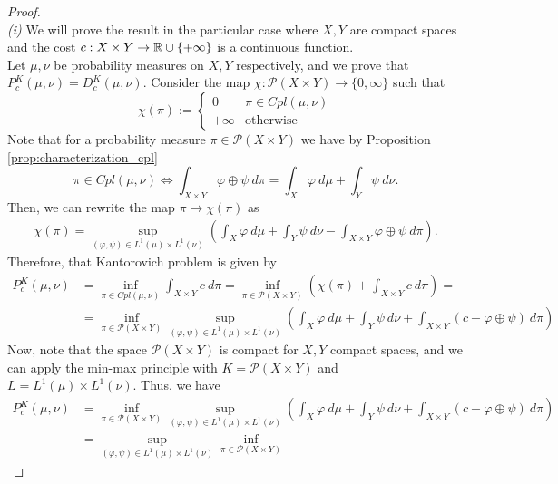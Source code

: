\documentclass[../main.tex]{subfiles}
\begin{document}
\begin{proof} \ \\
    \textit{(i)} We will prove the result in the particular case where $X, Y$ are compact spaces and the cost $c: X\times Y\to \mathbb{R}\cup\{+\infty\}$ is a continuous function. \\
    Let $\mu, \nu$ be probability measures on $X, Y$ respectively, and we prove that $P^K_c(\mu, \nu) = D^K_c(\mu, \nu)$. Consider the map $\chi : \mathcal{P}(X\times Y) \to \{0, \infty\}$ such that
    $$
    \chi(\pi) :=
    \begin{cases}
        0 & \pi\in Cpl(\mu, \nu) \\
        +\infty & \text{otherwise}
    \end{cases}
    $$
    Note that for a probability measure $\pi\in\mathcal{P}(X\times Y)$ we have by Proposition \ref{prop:characterization_cpl}
    $$
    \pi\in Cpl(\mu, \nu) \iff \int_{X\times Y} \varphi\oplus\psi \ d\pi = \int_X \varphi \ d\mu + \int_Y \psi \ d\nu.
    $$
    Then, we can rewrite the map $\pi\to\chi(\pi)$ as 
    \begin{align*}
        \chi(\pi) = \sup_{(\varphi, \psi)\in L^1(\mu)\times L^1(\nu)} 
        \left(\int_X \varphi \ d\mu + \int_Y \psi \ d\nu - \int_{X\times Y} \varphi \oplus \psi \ d\pi\right).
    \end{align*}
    Therefore, that Kantorovich problem is given by
    \begin{align*}
        P^K_c(\mu, \nu) 
        &= \inf_{\pi\in Cpl(\mu, \nu)} \int_{X\times Y} c \ d\pi
        = \inf_{\pi\in \mathcal{P}(X\times Y)} \left( \chi(\pi) + \int_{X\times Y} c \ d\pi \right) = \\
        &= \inf_{\pi\in\mathcal{P}(X\times Y)} \sup_{(\varphi, \psi)\in L^1(\mu)\times L^1(\nu)} \left(\int_X \varphi \ d\mu + \int_Y \psi \ d\nu + \int_{X\times Y} (c-\varphi \oplus \psi) \ d\pi\right)
    \end{align*}
    Now, note that the space $\mathcal{P}(X\times Y)$ is compact for $X, Y$ compact spaces, and we can apply the min-max principle with $K=\mathcal{P}(X\times Y)$ and $L=L^1(\mu)\times L^1(\nu)$. Thus, we have
    \begin{align*}
        P^K_c(\mu, \nu) 
        &= \inf_{\pi\in\mathcal{P}(X\times Y)} \sup_{(\varphi, \psi)\in L^1(\mu)\times L^1(\nu)} \left(\int_X \varphi \ d\mu + \int_Y \psi \ d\nu + \int_{X\times Y} (c-\varphi \oplus \psi) \ d\pi\right) \\
        &= \sup_{(\varphi, \psi)\in L^1(\mu)\times L^1(\nu)} \inf_{\pi\in\mathcal{P}(X\times Y)} 

\end{align*}
\end{proof}
\end{document}
